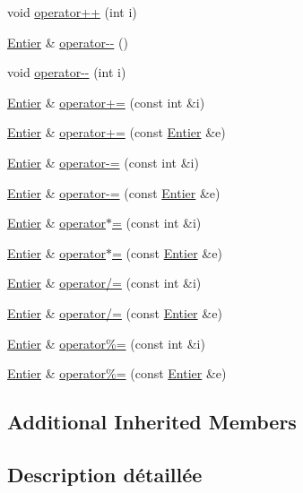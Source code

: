\begin{DoxyCompactItemize}
\item 
void \hyperlink{class_entier_aab83e1feb6a831985798dc29eafd6c4f}{operator++} (int i)
\item 
\hyperlink{class_entier}{Entier} \& \hyperlink{class_entier_ac54e5be59891760a29654c65f73740bd}{operator-\/-\/} ()
\item 
void \hyperlink{class_entier_a74a16719c1cfa70aae23289076e11603}{operator-\/-\/} (int i)
\item 
\hyperlink{class_entier}{Entier} \& \hyperlink{class_entier_a9fc7f0a86ca6c2c6d1f27c46aa4091a8}{operator+=} (const int \&i)
\item 
\hyperlink{class_entier}{Entier} \& \hyperlink{class_entier_a82de36cd5797697254f0e560f3fcb749}{operator+=} (const \hyperlink{class_entier}{Entier} \&e)
\item 
\hyperlink{class_entier}{Entier} \& \hyperlink{class_entier_a2fd722ed526998dd47f37d7f1c8e973a}{operator-\/=} (const int \&i)
\item 
\hyperlink{class_entier}{Entier} \& \hyperlink{class_entier_a054bed73fefc9262c480f925cd05e53e}{operator-\/=} (const \hyperlink{class_entier}{Entier} \&e)
\item 
\hyperlink{class_entier}{Entier} \& \hyperlink{class_entier_abccfd189f2404d19598045ab77626064}{operator$\ast$=} (const int \&i)
\item 
\hyperlink{class_entier}{Entier} \& \hyperlink{class_entier_a5b18e321fd792feb1868352c12fe5ba8}{operator$\ast$=} (const \hyperlink{class_entier}{Entier} \&e)
\item 
\hyperlink{class_entier}{Entier} \& \hyperlink{class_entier_aa11ea29bf56ca06bdef29ea611016f84}{operator/=} (const int \&i)
\item 
\hyperlink{class_entier}{Entier} \& \hyperlink{class_entier_a9273b726a0f5640b4e2940e71965a4c7}{operator/=} (const \hyperlink{class_entier}{Entier} \&e)
\item 
\hyperlink{class_entier}{Entier} \& \hyperlink{class_entier_a00ae0c4500fc317f70e3bcbe8962202e}{operator\%=} (const int \&i)
\item 
\hyperlink{class_entier}{Entier} \& \hyperlink{class_entier_aa40a5ac0715408ac63d30a18e9eb66f2}{operator\%=} (const \hyperlink{class_entier}{Entier} \&e)
\end{DoxyCompactItemize}
\subsection*{Additional Inherited Members}


\subsection{Description détaillée}
